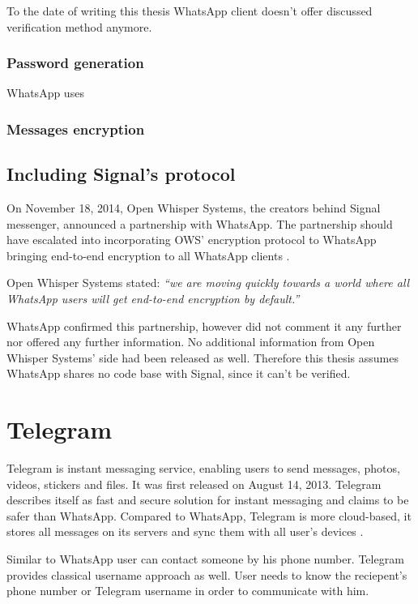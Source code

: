\documentclass[thesis=M,english]{FITthesis}[2012/10/20]
\begin{document}
To the date of writing this thesis WhatsApp client doesn't offer discussed verification method anymore.


\subsubsection{Password generation}

WhatsApp uses 

\subsubsection{Messages encryption}



\subsection{Including Signal's protocol}

On November 18, 2014, Open Whisper Systems, the creators behind Signal messenger, announced a partnership with WhatsApp. The partnership should have escalated into incorporating OWS' encryption protocol to WhatsApp bringing end-to-end encryption to all WhatsApp clients \cite{openwhisperwhatsapp}.

Open Whisper Systems stated: \emph{``we are moving quickly towards a world where all WhatsApp users will get end-to-end encryption by default.''} \cite{openwhisperwhatsapp}

WhatsApp confirmed this partnership, however did not comment it any further nor offered any further information\cite{x}. No additional information from Open Whisper Systems' side had been released as well. Therefore this thesis assumes WhatsApp shares no code base with Signal, since it can't be verified.

\section{Telegram}

Telegram is instant messaging service, enabling users to send messages, photos, videos, stickers and files. It was first released on August 14, 2013\cite{telegramfaq}. Telegram describes itself as fast and secure solution for instant messaging \cite{telegramfaq} and claims to be safer than WhatsApp\cite{telegramfaq}. Compared to WhatsApp, Telegram is more cloud-based, it stores all messages on its servers and sync them with all user's devices \cite{telegramfaq}. 

Similar to WhatsApp user can contact someone by his phone number. Telegram provides classical username approach as well. User needs to know the reciepent's phone number or Telegram username in order to communicate with him.
\end{document}
